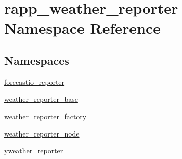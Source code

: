 \hypertarget{namespacerapp__weather__reporter}{\section{rapp\-\_\-weather\-\_\-reporter Namespace Reference}
\label{namespacerapp__weather__reporter}
}
\subsection*{Namespaces}
\begin{DoxyCompactItemize}
\item 
\hyperlink{namespacerapp__weather__reporter_1_1forecastio__reporter}{forecastio\-\_\-reporter}
\item 
\hyperlink{namespacerapp__weather__reporter_1_1weather__reporter__base}{weather\-\_\-reporter\-\_\-base}
\item 
\hyperlink{namespacerapp__weather__reporter_1_1weather__reporter__factory}{weather\-\_\-reporter\-\_\-factory}
\item 
\hyperlink{namespacerapp__weather__reporter_1_1weather__reporter__node}{weather\-\_\-reporter\-\_\-node}
\item 
\hyperlink{namespacerapp__weather__reporter_1_1yweather__reporter}{yweather\-\_\-reporter}
\end{DoxyCompactItemize}
